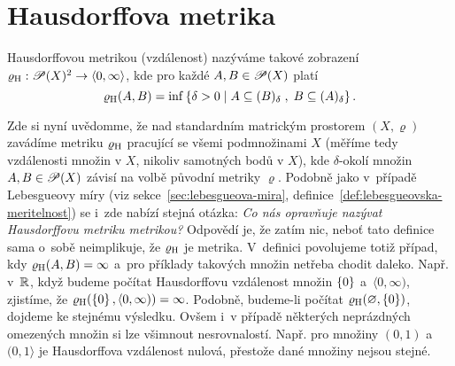 \section{Hausdorffova metrika}\label{sec:hausdorffova-metrika}

\begin{definition}\label{def:hausdorffova-metrika}
    Hausdorffovou metrikou (vzdálenost) nazýváme takové zobrazení $\varrho_\textup{H}:\mathscr{P}(X)^2 \rightarrow \langle0,\infty\rangle$, kde pro každé $A,B\in\mathscr{P}(X)$ platí
    \[\varrho_\textup{H}(A,B)=\inf\left\{\delta>0\;\middle|\;A\subseteq (B)_\delta\;,\;B\subseteq (A)_\delta\right\}.\]
\end{definition}
Zde si nyní uvědomme, že nad standardním matrickým prostorem $(X,\varrho)$ zavádíme metriku $\varrho_\textup{H}$ pracující se všemi podmnožinami $X$ (měříme tedy vzdálenosti množin v $X$, nikoliv samotných bodů v $X$), kde $\delta$-okolí množin $A,B\in\mathscr{P}(X)$ závisí na volbě původní metriky $\varrho$. Podobně jako v~případě Lebesgueovy míry (viz sekce~\ref{sec:lebesgueova-mira}, definice~\ref{def:lebesgueovska-meritelnost}) se i~zde nabízí stejná otázka: \emph{Co nás opravňuje nazývat Hausdorffovu metriku metrikou?} Odpovědí je, že zatím nic, neboť tato definice sama o~sobě neimplikuje, že $\varrho_\textup{H}$ je metrika. V~definici povolujeme totiž případ, kdy $\varrho_\textup{H}(A,B)=\infty$ a~pro příklady takových množin netřeba chodit daleko. Např. v~$\mathbb{R}$, když budeme počítat Hausdorffovu vzdálenost množin $\left\{0\right\}$ a~$\langle 0,\infty)$, zjistíme, že $\varrho_\textup{H}(\left\{0\right\},\langle 0,\infty))=\infty$. Podobně, budeme-li počítat $\varrho_\textup{H}(\varnothing,\left\{0\right\})$, dojdeme ke stejnému výsledku. Ovšem i~v případě některých neprázdných omezených množin si lze všimnout nesrovnalostí. Např. pro množiny $(0,1)$ a~$(0,1\rangle$ je Hausdorffova vzdálenost nulová, přestože dané množiny nejsou stejné.

